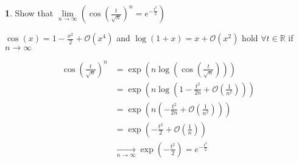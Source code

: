 \documentclass[a4paper, 10pt]{article}
\theoremstyle{definition}
\theoremstyle{ex}
\newtheorem*{exercise}{}
\theoremstyle{named}
\newcommand{\R}{\mathbb{R}}
\newcommand{\BO}{\mathcal{O}}
\begin{document}
\begin{exercise}
    Show that $\lim\limits_{n\to\infty} \left(\cos\left(\frac{t}{\sqrt{n}}\right)^n = e^{-\frac{t^2}{2}} \right)$
    \begin{exanswers}
        \item $\cos(x) = 1 - \frac{x^2}{2} + \BO(x^4)$ and $\log(1 + x) = x + \BO(x^2)$ hold $\forall t \in \R$ if $n \to \infty$
    \end{exanswers}
    \begin{align*}
        \cos\left(\frac{t}{\sqrt{n}}\right)^n &= \exp\left(n \log \left(\cos \left(\frac{t}{\sqrt{n}}\right)\right)\right) \\
        &= \exp\left(n \log \left(1 - \frac{t^2}{2n} + \BO\left(\frac{1}{n^2}\right)\right)\right) \\
        &= \exp\left(n\left(-\frac{t^2}{2n} + \BO\left(\frac{1}{n^2}\right)\right)\right) \\
        &= \exp\left(-\frac{t^2}{2} + \BO\left(\frac{1}{n}\right)\right) \\
        &\underset{n\to\infty}{\to} \exp\left(-\frac{t^2}{2}\right) = e^{-\frac{t^2}{2}}
    \end{align*}
\end{exercise}
\end{document}
